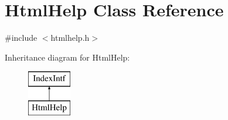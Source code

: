 \hypertarget{class_html_help}{}\section{Html\+Help Class Reference}
\label{class_html_help}


{\ttfamily \#include $<$htmlhelp.\+h$>$}

Inheritance diagram for Html\+Help\+:\begin{figure}[H]
\begin{center}
\leavevmode
\includegraphics[height=2.000000cm]{class_html_help}
\end{center}
\end{figure}
